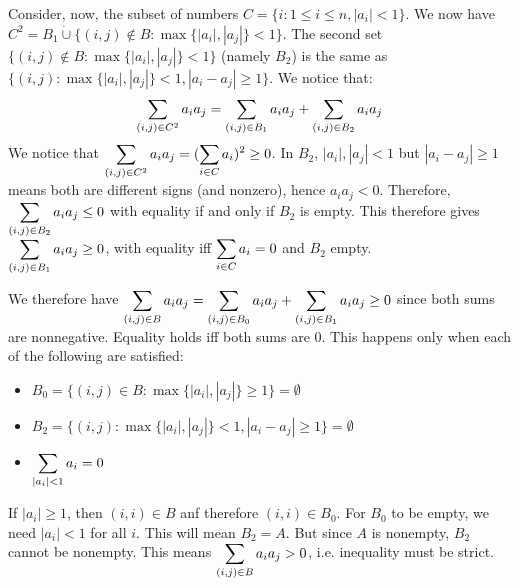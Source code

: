 \documentclass[11pt,a4paper]{article}
\begin{document}
\begin{enumerate}
	Consider, now, the subset of numbers $C=\{i: 1\le i\le n, |a_i|<1\}$. We now have $C^2 = B_1\dot\cup \{(i, j)\not\in B: \max\{|a_i|, |a_j|\}< 1\}$. The second set $\{(i, j)\not\in B: \max\{|a_i|, |a_j|\}< 1\}$ (namely $B_2$) is the same as $\{(i, j) : \max\{|a_i|, |a_j|\}< 1, |a_i-a_j|\ge 1\}$. We notice that: 
	\[
	\displaystyle\sum_{(i, j) \in C^2}a_ia_j
	=\displaystyle\sum_{(i, j) \in B_1}a_ia_j+\displaystyle\sum_{(i, j) \in B_2}a_ia_j
	\]
	We notice that $\displaystyle\sum_{(i, j) \in C^2}a_ia_j=(\displaystyle\sum_{i \in C} a_i)^2\ge 0$. In $B_2$, $|a_i|, |a_j|<1$ but $|a_i-a_j|\ge 1$ means both are different signs (and nonzero), hence $a_ia_j<0$. Therefore, $\displaystyle\sum_{(i, j) \in B_2}a_ia_j\le 0$ with equality if and only if $B_2$ is empty. This therefore gives $\displaystyle\sum_{(i, j) \in B_1}a_ia_j\ge 0$, with equality iff $\displaystyle\sum_{i \in C} a_i=0$ and $B_2$ empty. 
	
	We therefore have $\displaystyle\sum_{(i, j) \in B}a_ia_j=\displaystyle\sum_{(i, j) \in B_0}a_ia_j+\displaystyle\sum_{(i, j) \in B_1}a_ia_j\ge 0$ since both sums are nonnegative. Equality holds iff both sums are 0. This happens only when each of the following are satisfied: 
	\begin{itemize}
		\item $B_0=\{(i, j)\in B: \max\{|a_i|, |a_j|\}\ge 1\}=\emptyset$
		\item $B_2=\{(i, j) : \max\{|a_i|, |a_j|\}< 1, |a_i-a_j|\ge 1\}=\emptyset$
		\item $\displaystyle\sum_{|a_i|<1}a_i=0$
	\end{itemize}
	If $|a_i|\ge 1$, then $(i, i)\in B$ anf therefore $(i, i)\in B_0$. For $B_0$ to be empty, we need $|a_i|<1$ for all $i$. This will mean $B_2=A$. But since $A$ is nonempty, $B_2$ cannot be nonempty. This means $\displaystyle\sum_{(i, j)\in B}a_ia_j>0$, i.e. inequality must be strict. 
\end{enumerate}
\end{document}
